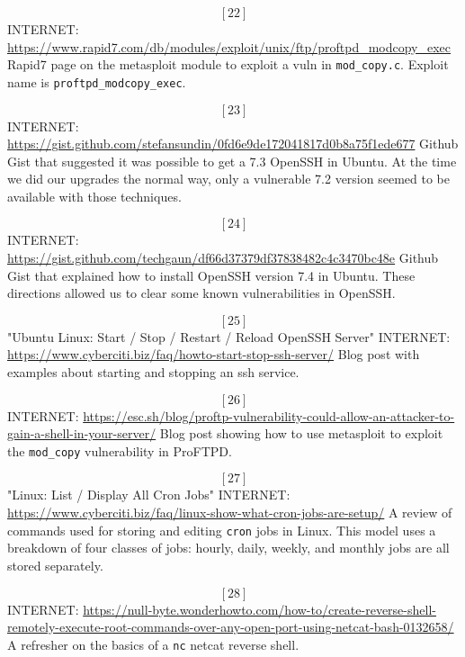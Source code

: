 \[[22]\]  INTERNET: \url{https://www.rapid7.com/db/modules/exploit/unix/ftp/proftpd_modcopy_exec}
Rapid7 page on the metasploit module to \gls{exploit} a vuln in \texttt{mod\_copy.c}.  Exploit name is \texttt{proftpd\_modcopy\_exec}.

\[[23]\]  INTERNET: \url{https://gist.github.com/stefansundin/0fd6e9de172041817d0b8a75f1ede677}
Github Gist that suggested it was possible to get a 7.3 OpenSSH in Ubuntu.  At the time we did our upgrades the normal way, only a vulnerable 7.2 version seemed to be available with those techniques.

\[[24]\]  INTERNET: \url{https://gist.github.com/techgaun/df66d37379df37838482c4c3470bc48e}
Github Gist that explained how to install OpenSSH version 7.4 in Ubuntu.  These directions allowed us to clear some known vulnerabilities in OpenSSH.

\[[25]\]  "Ubuntu Linux: Start / Stop / Restart / Reload OpenSSH Server"  INTERNET: \url{https://www.cyberciti.biz/faq/howto-start-stop-ssh-server/}
Blog post with examples about starting and stopping an ssh service.

\[[26]\]  INTERNET: \url{https://esc.sh/blog/proftp-vulnerability-could-allow-an-attacker-to-gain-a-shell-in-your-server/}
Blog post showing how to use metasploit to exploit the \texttt{mod\_copy} vulnerability in ProFTPD.

\[[27]\]  "Linux: List / Display All Cron Jobs"  INTERNET: \url{https://www.cyberciti.biz/faq/linux-show-what-cron-jobs-are-setup/}
A review of commands used for storing and editing \texttt{cron} jobs in Linux.  This model uses a breakdown of four classes of jobs:  hourly, daily, weekly, and monthly jobs are all stored separately. 

\[[28]\]  INTERNET: \url{https://null-byte.wonderhowto.com/how-to/create-reverse-shell-remotely-execute-root-commands-over-any-open-port-using-netcat-bash-0132658/}
A refresher on the basics of a \texttt{nc} netcat reverse shell.

